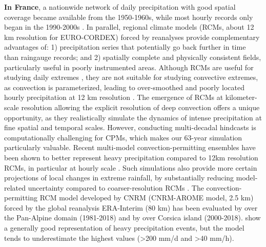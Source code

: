 \documentclass[hess, manuscript]{copernicus}
\begin{document}
\textbf{In France}, a nationwide network of daily precipitation with good spatial coverage became available from the 1950-1960s, while most hourly records only began in the 1990-2000s \citep{meteofrance2024}. In parallel, regional climate models (RCMs, about 12 km resolution for EURO-CORDEX) forced by reanalyses provide complementary advantages of: 1) precipitation series that potentially go back further in time than raingauge records; and 2) spatially complete and
physically consistent fields, particularly useful in poorly instrumented
areas. Although RCMs are useful for studying daily extremes \citep{dierickx-etal-2025,steensen-etal-2025}, they are not suitable for studying convective extremes, as convection is parameterized, leading to over-smoothed and
poorly located hourly precipitation at 12 km resolution \citep{KilometerScaleClimateModelsProspectsandChallenges}. 
The emergence of RCMs at kilometer-scale resolution allowing the explicit resolution of deep convection  offers a unique opportunity, as they realistically simulate the dynamics of intense precipitation at fine spatial and temporal scales. However, conducting multi-decadal hindcasts is computationally challenging for CPMs, which makes our 63-year simulation particularly valuable. Recent multi-model convection-permitting ensembles have been shown to better represent heavy precipitation  compared to 12km resolution RCMs, in particular at hourly scale  \citep{ban-etal-2021,pichelli-etal-2021,berthou-etal-2020}. Such simulations also provide more certain projections of local changes in extreme rainfall, by substantially reducing model-related uncertainty compared to coarser-resolution RCMs \citep{Fosser2024}. The convection-permitting RCM model developed by CNRM (CNRM-AROME model, 2.5 km) forced by the global reanalysis ERA-Interim (80 km) has been evaluated by \cite{Caillaud2021} over the Pan-Alpine domain (1981-2018) and by \cite{Cortes-Hernandez2024} over Corsica island (2000-2018). \cite{Caillaud2021} show a generally good representation of heavy precipitation events, but the model tends to underestimate the highest values (>200 mm/d and >40 mm/h).
\end{document}
